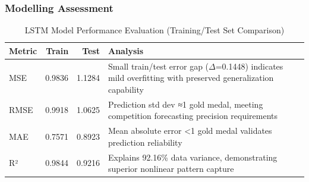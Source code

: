 \documentclass{mcmthesis}
\begin{document}
\subsubsection{Modelling Assessment}

\begin{table}[H]
	\centering
	\caption{LSTM Model Performance Evaluation (Training/Test Set Comparison)}
	\label{tab:model_performance}
	\begin{tabular}{lrrp{8cm}}
		\toprule
		\rowcolor{red!10}
		\textbf{Metric} & \textbf{Train} & \textbf{Test} & \textbf{Analysis} \\
		\midrule
		\rowcolor{gray!10}
		MSE  & 0.9836 & 1.1284 & Small train/test error gap ($\Delta$=0.1448) indicates mild overfitting with preserved generalization capability \\
		RMSE & 0.9918 & 1.0625 & Prediction std dev ≈1 gold medal, meeting competition forecasting precision requirements \\
		\rowcolor{gray!10}
		MAE  & 0.7571 & 0.8923 & Mean absolute error <1 gold medal validates prediction reliability \\
		R²   & 0.9844 & 0.9216 & Explains 92.16\% data variance, demonstrating superior nonlinear pattern capture \\
		\bottomrule
	\end{tabular}
\end{table}
\end{document}

